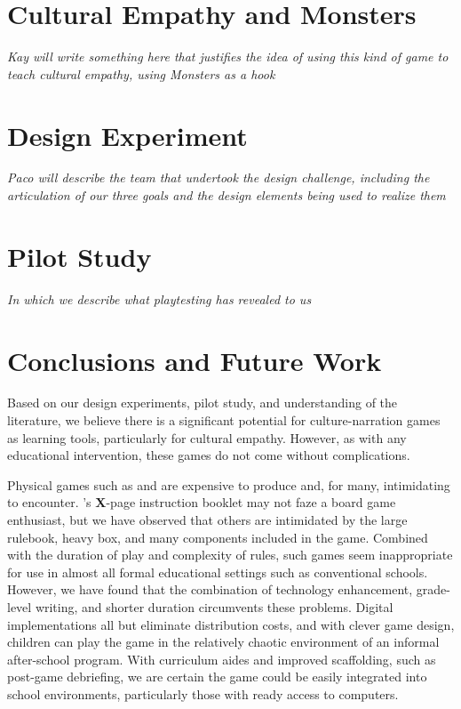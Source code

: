 \documentclass[a4paper]{article}
\begin{document}
\section{Cultural Empathy and Monsters}

\textit{Kay will write something here that justifies the idea of using this kind of game to teach cultural empathy, using Monsters as a hook}

\section{Design Experiment}

\textit{Paco will describe the team that undertook the design challenge, including the articulation of our three goals and the design elements being used to realize them}

\section{Pilot Study}

\textit{In which we describe what playtesting has revealed to us}

\section{Conclusions and Future Work}

Based on our design experiments, pilot study, and understanding of the
literature, we believe there is a significant potential for
culture-narration games as learning tools, particularly for
cultural empathy.
However, as with any educational intervention, these games do not
come without complications.

Physical games such as \totan{} and \smersh{} are expensive to produce
and, for many, intimidating to encounter. \totan{}'s \textbf{X}-page
instruction booklet may not faze a board game enthusiast, but we have
observed that others are intimidated by the large rulebook, heavy box,
and many components included in the game. Combined with the duration
of play and complexity of rules, such games seem inappropriate for use
in almost all formal educational settings such as conventional
schools.  However, we have found that the combination of technology
enhancement, grade-level writing, and shorter duration circumvents
these problems.  Digital implementations all but eliminate
distribution costs, and with clever game design, children can play the
game in the relatively chaotic environment of an informal after-school
program. With curriculum aides and improved scaffolding, such as
post-game debriefing, we are certain the game could be easily
integrated into school environments, particularly those with
ready access to computers.
\end{document}
